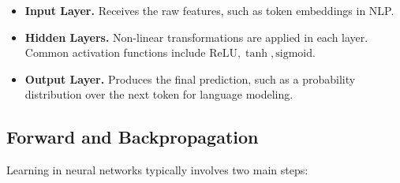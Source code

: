 \begin{itemize}
    \item \textbf{Input Layer.} Receives the raw features, such as token embeddings in NLP.
    \item \textbf{Hidden Layers.} Non-linear transformations are applied in each layer. Common activation functions include $\text{ReLU}, \tanh, \text{sigmoid}$.
    \item \textbf{Output Layer.} Produces the final prediction, such as a probability distribution over the next token for language modeling.
\end{itemize}

\subsection{Forward and Backpropagation}
\noindent
Learning in neural networks typically involves two main steps:
